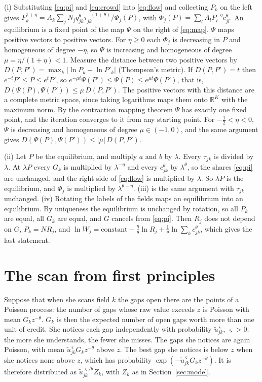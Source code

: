 \documentclass[11pt,letterpaper]{article}
\newcommand{\R}{\mathbb{R}}
\newcommand{\ut}{\tilde u}
\newcommand{\proofof}[1]{\needspace{3\baselineskip}\par\smallskip\noindent{\sffamily\bfseries\small\color{ink}#1.}\enspace}
\begin{document}
\proofof{Proof of Proposition~\ref{prop:eq}}
(i) Substituting \eqref{eq:pi} and \eqref{eq:crowd} into \eqref{eq:flow} and collecting $P_k$ on the left gives $P_k^{1+\eta}=A_k\sum_jN_jq_{jk}^{\theta}\tau_{jk}^{-(1+\theta)}/\Phi_j(P)$, with $\Phi_j(P)=\sum_lA_lP_l^{-\eta}c_{jl}^{\theta}$. An equilibrium is a fixed point of the map $\Psi$ on the right of \eqref{eq:map}. $\Psi$ maps positive vectors to positive vectors. For $\eta\ge0$ each $\Phi_j$ is decreasing in $P$ and homogeneous of degree $-\eta$, so $\Psi$ is increasing and homogeneous of degree $\mu=\eta/(1+\eta)<1$. Measure the distance between two positive vectors by $D(P,P')=\max_k|\ln P_k-\ln P'_k|$ (Thompson's metric). If $D(P,P')=t$ then $e^{-t}P'\le P\le e^{t}P'$, so $e^{-\mu t}\Psi(P')\le\Psi(P)\le e^{\mu t}\Psi(P')$, that is, $D(\Psi(P),\Psi(P'))\le\mu\,D(P,P')$. The positive vectors with this distance are a complete metric space, since taking logarithms maps them onto $\R^K$ with the maximum norm. By the contraction mapping theorem $\Psi$ has exactly one fixed point, and the iteration converges to it from any starting point. For $-\tfrac12<\eta<0$, $\Psi$ is decreasing and homogeneous of degree $\mu\in(-1,0)$, and the same argument gives $D(\Psi(P),\Psi(P'))\le|\mu|\,D(P,P')$.

(ii) Let $P$ be the equilibrium, and multiply $a$ and $b$ by $\lambda$. Every $\tau_{jk}$ is divided by $\lambda$. At $\lambda P$ every $G_k$ is multiplied by $\lambda^{-\eta}$ and every $c_{jk}^{\theta}$ by $\lambda^{\theta}$, so the shares \eqref{eq:pi} are unchanged, and the right side of \eqref{eq:flow} is multiplied by $\lambda$. So $\lambda P$ is the equilibrium, and $\Phi_j$ is multiplied by $\lambda^{\theta-\eta}$. (iii) is the same argument with $\tau_{jk}$ unchanged. (iv) Rotating the labels of the fields maps an equilibrium into an equilibrium. By uniqueness the equilibrium is unchanged by rotation, so all $P_k$ are equal, all $G_k$ are equal, and $G$ cancels from \eqref{eq:pi}. Then $R_j$ does not depend on $G$, $P_k=N R_j$, and $\ln W_j=\text{constant}-\tfrac{\eta}{\theta}\ln R_j+\tfrac1\theta\ln\sum_kc_{jk}^{\theta}$, which gives the last statement.

\section{The scan from first principles}\label{app:scan}

Suppose that when she scans field $k$ the gaps open there are the points of a Poisson process: the number of gaps whose raw value exceeds $z$ is Poisson with mean $G_kz^{-\theta}$. $G_k$ is then the expected number of open gaps worth more than one unit of credit. She notices each gap independently with probability $\ut_{jk}^{\,\varsigma}$, $\varsigma>0$: the more she understands, the fewer she misses. The gaps she notices are again Poisson, with mean $\ut_{jk}^{\,\varsigma}G_kz^{-\theta}$ above $z$. The best gap she notices is below $z$ when she notices none above $z$, which has probability $\exp(-\ut_{jk}^{\,\varsigma}G_kz^{-\theta})$. It is therefore distributed as $\ut_{jk}^{\,\varsigma/\theta}Z_k$, with $Z_k$ as in Section~\ref{sec:model}.
\end{document}
